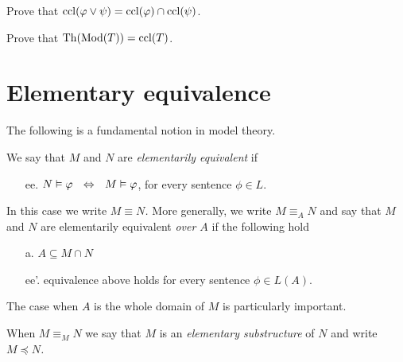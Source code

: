 \begin{exercise}
Prove that ${\rm ccl}(\varphi\vee \psi)={\rm ccl}(\varphi)\cap{\rm ccl}(\psi)$.
\end{exercise}


\begin{exercise}
Prove that ${\rm Th}(\mathop{\rm Mod}(T))={\rm ccl}(T)$.
\end{exercise}



\section{Elementary equivalence}\label{eqel}
The following is a fundamental notion in model theory.

\begin{definition}\label{def_el_eq}
We say that $M$ and $N$ are \emph{elementarily equivalent\/} if
\begin{itemize}
\item[ee.] $N\vDash\varphi\ \ \Leftrightarrow\ \ M\vDash \varphi$,\hspace{4ex} for every sentence $\phi\in L$.
\end{itemize}
In this case we write \emph{$M\equiv N$.}
More generally, we write \emph{$M\equiv_A N$\/} and say that $M$ and $N$ are elementarily equivalent \emph{over $A$\/} if the following hold
\begin{itemize}
\item[a.] $A\subseteq M\cap N$
\item[ee'.] equivalence  above holds for every sentence $\phi\in L(A)$.
\end{itemize} 
\end{definition}

The case when $A$ is the whole domain of $M$ is particularly important.

\begin{definition}\label{def_el_sub}
When $M\equiv_M N$ we say that $M$ is an \emph{elementary substructure\/} of $N$ and write \emph{$M\preceq N$.}
\end{definition}

